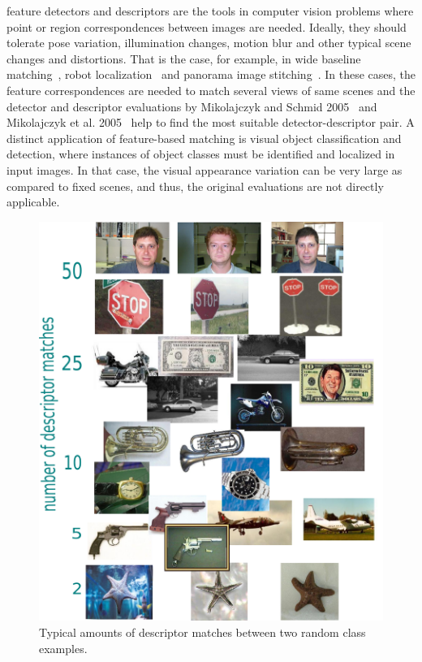 \documentclass[10pt,journal,cspaper,compsoc]{IEEEtran}
\begin{document}
% 
% 
% 
% 

feature detectors and descriptors are the tools
in computer vision problems where point or region correspondences between images are needed.
Ideally, they should tolerate pose variation, illumination changes,
motion blur and other typical scene changes and distortions. That is
the case, for example, in
wide baseline matching~\cite{TuyGoo:2004}, robot
localization~\cite{SeLowLit:2002} and panorama image
stitching~\cite{BroLow:2003}. In these cases, 
the feature correspondences are needed to match several views of
same scenes and the detector and descriptor
evaluations by Mikolajczyk and Schmid 2005~\cite{MikTuySch:2005} and
Mikolajczyk et al. 2005~\cite{MikSch:2005} help to find the
most suitable detector-descriptor pair. A distinct application of
feature-based matching is visual object classification and
detection, where instances of object classes must be identified
and localized in input images. In that case, the visual appearance
variation can be very large as compared to fixed scenes, and thus,
the original evaluations are not directly applicable.
%
\begin{figure}[t]
\begin{center}
  \includegraphics[width=0.8\linewidth]{resources/number_of_descriptor_matches.pdf}
  \caption{Typical amounts of descriptor matches between two random class examples.\label{fig:teaser}}
\end{center}
\end{figure}
%
\end{document}
